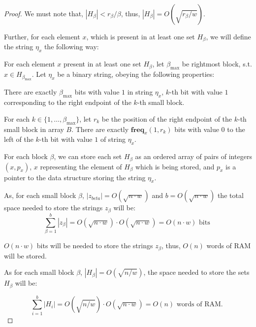 \documentclass[runningheads]{llncs}
\begin{document}
\begin{proof}
    We must note that, $|H_{\beta}|<r_{\beta}/\beta$, thus, $|H_{\beta}|=O(\sqrt{r_{\beta}/w})$.

    Further, for each element $x$, which is present in at least one set $H_{\beta}$, we will define the string $\eta_{x}$ the following way:

    \begin{definition}
        For each element $x$ present in at least one set $H_{\beta}$, let $\beta_{\text{max}}$ be rightmost block, s.t. $x\in H_{\beta_{\text{max}}}$. 
        Let $\eta_x$ be a binary string, obeying the following properties:
        \begin{property}
            There are exactly $\beta_{\text{max}}$ bits with value $1$ in string $\eta_x$, $k$-th bit with value $1$ corresponding to the right endpoint of the $k$-th small block.
        \end{property}

        \begin{property}
            For each $k\in\{1,\dots, \beta_{\text{max}}\}$, let $r_k$ be the position of the right endpoint of the $k$-th small block in array $B$. 
            There are exactly $\textbf{freq}_x(1,r_k)$ bits with value $0$ to the left of the $k$-th bit with value $1$ of string $\eta_x$.
        \end{property}
    \end{definition}


    For each block $\beta$, we can store each set $H_{\beta}$ as an ordered array of pairs of integers $(x, p_x)$, $x$ representing the element of $H_{\beta}$ which is being stored, and $p_x$ is a pointer to the 
    data structure storing the string $\eta_x$.
    
    As, for each small block $\beta$, $|z_{beta}|=O(\sqrt{n\cdot w})$ and $b=O(\sqrt{n\cdot w})$  the total space needed to store the strings $z_{\beta}$ will be:
    \[
        \sum_{\beta=1}^{b} |z_{\beta}| = O(\sqrt{n\cdot w}) \cdot O(\sqrt{n\cdot w}) = O(n \cdot w) \text{ bits }
    \]

    $O(n\cdot w)$ bits will be needed to store the strings $z_{\beta}$, thus, $O(n)$ words of RAM will be stored.
    
    As for each small block $\beta$, $|H_{\beta}|=O(\sqrt{n/w})$, the space needed to store the sets $H_{\beta}$ will be:

    \[
        \sum_{i=1}^{b} | H_{i} | = O( \sqrt{n/w} ) \cdot O( \sqrt{n\cdot w} ) = O(n) \text{ words of RAM. }
    \]



\end{proof}
\end{document}
